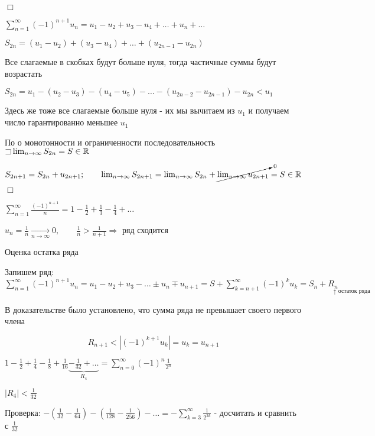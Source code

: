 \documentclass[12pt]{article}
\begin{document}
    \begin{MyProof}
        $\Box$

        $\sum_{n = 1}^\infty (-1)^{n + 1} u_n = u_1 - u_2 + u_3 - u_4 + \dots + u_n + \dots$

        $S_{2n} = (u_1 - u_2) + (u_3 - u_4) + \dots + (u_{2n - 1} - u_{2n})$

        Все слагаемые в скобках будут больше нуля, тогда частичные суммы будут возрастать

        $S_{2n} = u_1 - (u_2 - u_3) - (u_4 - u_5) - \dots - (u_{2n - 2} - u_{2n - 1}) - u_{2n} < u_1$

        Здесь же тоже все слагаемые больше нуля - их мы вычитаем из $u_1$ и получаем число гарантированно меньшее $u_1$

        По \Ths о монотонности и ограниченности последовательность $\mathord{\sqsupset} \lim_{n \to \infty} S_{2n} = S \in \mathbb{R}$

        $S_{2n + 1} = S_{2n} + u_{2n + 1}; \qquad \lim_{n \to \infty} S_{2n + 1} = \lim_{n \to \infty} S_{2n} + \cancelto{0}{\lim_{n \to \infty} u_{2n + 1}} = S \in \mathbb{R}$

        $\Box$
    \end{MyProof}

    \Exs $\sum_{n = 1}^\infty \frac{(-1)^{n + 1}}{n} = 1 - \frac{1}{2} + \frac{1}{3} - \frac{1}{4} + \dots$

    $u_n = \frac{1}{n} \underset{n \to \infty}{\longrightarrow} 0, \qquad \frac{1}{n} > \frac{1}{n + 1} \Longrightarrow$ ряд сходится

    \hypertarget{seriesremainderevaluation}{}

    \Nota Оценка остатка ряда

    Запишем ряд: $\sum_{n = 1}^\infty (-1)^{n + 1} u_n = u_1 - u_2 + u_3 - \dots \pm u_n \mp u_{n + 1} =
    S + \sum_{k = n + 1}^\infty (-1)^{k} u_k = S_n + \underset{\uparrow \text{ остаток ряда}}{R_n\phantom{ikkkkkkkk}}$

    В доказательстве \Ths было установлено, что сумма ряда не превышает своего первого члена

    \[R_{n + 1} < |(-1)^{k + 1} u_k| = u_k = u_{n + 1}\]

    \Ex $1 - \frac{1}{2} + \frac{1}{4} - \frac{1}{8} + \frac{1}{16} \underset{R_4}{\underbrace{ - \frac{1}{32} + \dots}} = \sum_{n = 0}^\infty (-1)^n \frac{1}{2^n}$

    $|R_4| < \frac{1}{32}$

    Проверка: $-\left(\frac{1}{32} - \frac{1}{64}\right) - \left(\frac{1}{128} - \frac{1}{256}\right) - \dots = -\sum_{k = 3}^\infty \frac{1}{2^{2k}}$ - \Lab досчитать и сравнить с $\frac{1}{32}$
\end{document}
